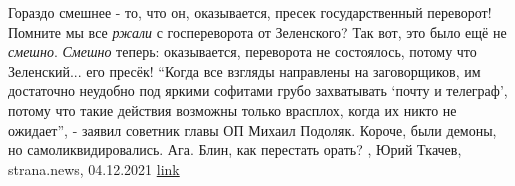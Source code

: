 Гораздо смешнее - то, что он, оказывается, пресек государственный переворот!
Помните мы все \emph{ржали} с госпереворота от Зеленского? Так вот, это было ещё не
\emph{смешно}. \emph{Смешно} теперь: оказывается, переворота не состоялось, потому что
Зеленский... его пресёк!  \enquote{Когда все взгляды направлены на заговорщиков, им
достаточно неудобно под яркими софитами грубо захватывать \enquote{почту и телеграф},
потому что такие действия возможны только врасплох, когда их никто не ожидает},
- заявил советник главы ОП Михаил Подоляк.  Короче, были демоны, но
самоликвидировались. Ага.  Блин, как перестать орать?
, 
Юрий Ткачев, strana.news, 04.12.2021
\href{https://strana.news/opinions/365439-teorija-zahovora-ot-zelenskoho-eto-bylo-eshche-ne-samoe-smeshnoe.html}{link}
